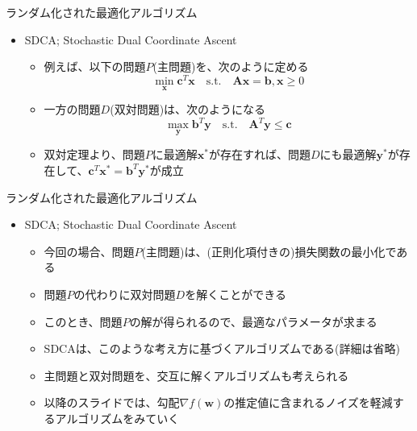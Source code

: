 \documentclass[dvipdfmx,notheorems,t]{beamer}
\begin{document}
\begin{frame}{ランダム化された最適化アルゴリズム}

\begin{itemize}
	\item SDCA; Stochastic Dual Coordinate Ascent
	\begin{itemize}		
		\item 例えば、以下の問題$P$(主問題)を、次のように定める
		\begin{equation}
			\min_{\bm{x}} \bm{c}^T \bm{x} \quad \mathrm{s.t.} \quad \bm{A} \bm{x} = \bm{b}, \bm{x} \ge 0
		\end{equation}
		
		\item 一方の問題$D$(双対問題)は、次のようになる
		\begin{equation}
			\max_{\bm{y}} \bm{b}^T \bm{y} \quad \mathrm{s.t.} \quad \bm{A}^T \bm{y} \le \bm{c}
		\end{equation}
		
		\item 双対定理より、問題$P$に最適解$\bm{x}^*$が存在すれば、問題$D$にも最適解$\bm{y}^*$が存在して、$\bm{c}^T \bm{x}^* = \bm{b}^T \bm{y}^*$が成立
	\end{itemize}
\end{itemize}

\end{frame}

\begin{frame}{ランダム化された最適化アルゴリズム}

\begin{itemize}
	\item SDCA; Stochastic Dual Coordinate Ascent
	\begin{itemize}		
		\item 今回の場合、問題$P$(主問題)は、(正則化項付きの)\alert{損失関数の最小化}である
		\item 問題$P$の代わりに双対問題$D$を解くことができる
		\item このとき、問題$P$の解が得られるので、最適なパラメータが求まる
		\newline
		
		\item SDCAは、このような考え方に基づくアルゴリズムである(詳細は省略)
		\newline
		
		\item 主問題と双対問題を、交互に解くアルゴリズムも考えられる
		\newline
		
		\item 以降のスライドでは、勾配$\nabla f(\bm{w})$の推定値に含まれる\alert{ノイズ}を軽減するアルゴリズムをみていく
	\end{itemize}
\end{itemize}

\end{frame}
\end{document}
